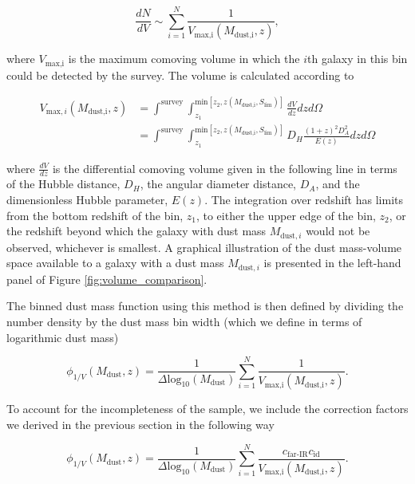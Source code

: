 \begin{equation}
    \frac{dN}{dV} \sim \sum_{i=1}^N \frac{1}{V_{\textrm{max,i}}(M_{\textrm{dust,i}},z)},
\label{eq:number_density_1/v_method}
\end{equation}

\noindent where $V_{\textrm{max,i}}$ is the maximum comoving volume in which the $i$th galaxy in this bin could be detected by the survey. The volume is calculated according to

\begin{align}
    V_{\textrm{max},i}(M_{\textrm{dust,i}},z) &= \int^{\scriptscriptstyle \textrm{survey}} \int_{\scriptscriptstyle z_1}^{\scriptscriptstyle \textrm{min}[z_2, z(M_{\textrm{dust,i}},S_{\textrm{lim}})]} \frac{dV}{dz} dz d\Omega \nonumber \\
    &= \int^{\scriptscriptstyle \textrm{survey}} \int_{\scriptscriptstyle z_1}^{\scriptscriptstyle \textrm{min}[z_2, z(M_{\textrm{dust,i}},S_{\textrm{lim}})]} D_H \frac{(1+z)^2 D_A^2}{E(z)} dz d\Omega
\label{eq:volume_1/v_method}
\end{align}

\noindent where $\frac{dV}{dz}$ is the differential comoving volume given in the following line in terms of the Hubble distance, $D_H$, the angular diameter distance, $D_A$, and the dimensionless Hubble parameter, $E(z)$. The integration over redshift has limits from the bottom redshift of the bin, $z_1$, to either the upper edge of the bin, $z_2$, or the redshift beyond which the galaxy with dust mass $M_{\textrm{dust},i}$ would not be observed, whichever is smallest. A graphical illustration of the dust mass-volume space available to a galaxy with a dust mass $M_{\textrm{dust},i}$ is presented in the left-hand panel of Figure \ref{fig:volume_comparison}.

The binned dust mass function using this method is then defined by dividing the number density by the dust mass bin width (which we define in terms of logarithmic dust mass)

\begin{equation}
    \phi_{1/V}(M_{\textrm{dust}},z) = \frac{1}{\Delta \textrm{log}_{10}(M_{\textrm{dust}})} \sum_{i=1}^N \frac{1}{V_{\textrm{max,i}}(M_{\textrm{dust,i}},z)}.
\label{eq:phi_1/v_method}
\end{equation}

To account for the incompleteness of the sample, we include the correction factors we derived in the previous section in the following way

\begin{equation}
    \phi_{1/V}(M_{\textrm{dust}},z) = \frac{1}{\Delta \textrm{log}_{10}(M_{\textrm{dust}})} \sum_{i=1}^N \frac{c_{\scriptscriptstyle \textrm{far-IR}} c_{\scriptscriptstyle \textrm{id}}}{V_{\textrm{max,i}}(M_{\textrm{dust,i}},z)}.
\label{eq:phi_1/v_method}
\end{equation}

